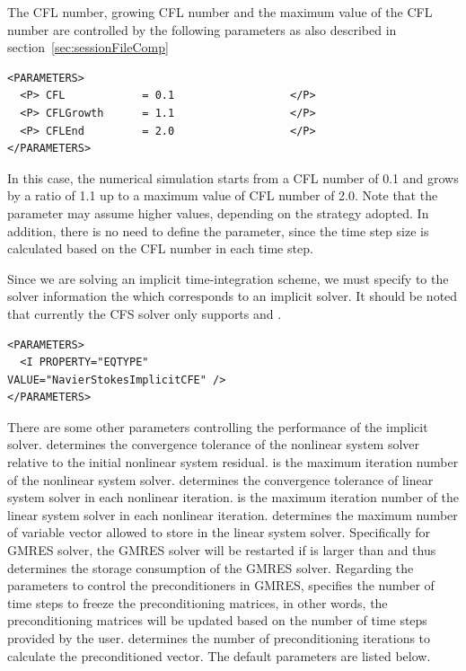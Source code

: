 The CFL number, growing CFL number and the maximum value of the CFL number 
are controlled by the following parameters as also described in section~\ref{sec:sessionFileComp}
\begin{lstlisting}[style=XmlStyle]
<PARAMETERS>
  <P> CFL            = 0.1                  </P>
  <P> CFLGrowth      = 1.1                  </P>
  <P> CFLEnd         = 2.0                  </P>
</PARAMETERS>
\end{lstlisting}
In this case, the numerical simulation starts from a CFL number of 0.1 and grows 
by a ratio of 1.1 up to a maximum value of CFL number of 2.0. Note that the 
 parameter may assume higher values, depending on the strategy 
adopted. In addition, there is no need to define the  parameter, 
since the time step size is calculated based on the CFL number in each time step.

Since we are solving an implicit time-integration scheme, we must specify to 
the solver information the  which corresponds to an implicit solver. 
It should be noted that currently the CFS solver only supports 
 and .
\begin{lstlisting}[style=XmlStyle]
<PARAMETERS>
  <I PROPERTY="EQTYPE"                        VALUE="NavierStokesImplicitCFE" />
</PARAMETERS>
\end{lstlisting}

There are some other parameters controlling the performance of the implicit 
solver.  determines the convergence tolerance 
of the nonlinear system solver relative to the initial nonlinear system residual. 
 is the maximum iteration number of the 
nonlinear system solver.  determines the 
convergence tolerance of linear system solver in each nonlinear iteration. 
 is the maximum iteration number of the linear 
system solver in each nonlinear iteration.  determines 
the maximum number of variable vector allowed to store in the linear system 
solver. Specifically for GMRES solver, the GMRES solver will be restarted if 
 is larger than  and thus 
 determines the storage consumption of the GMRES solver. 
Regarding the parameters to control the preconditioners in GMRES, 
 specifies the number of time steps to freeze the 
preconditioning matrices, in other words, the preconditioning matrices will be 
updated based on the number of time steps provided by the user.  
determines the number of preconditioning iterations to calculate the
preconditioned vector. The default parameters are listed below. 

